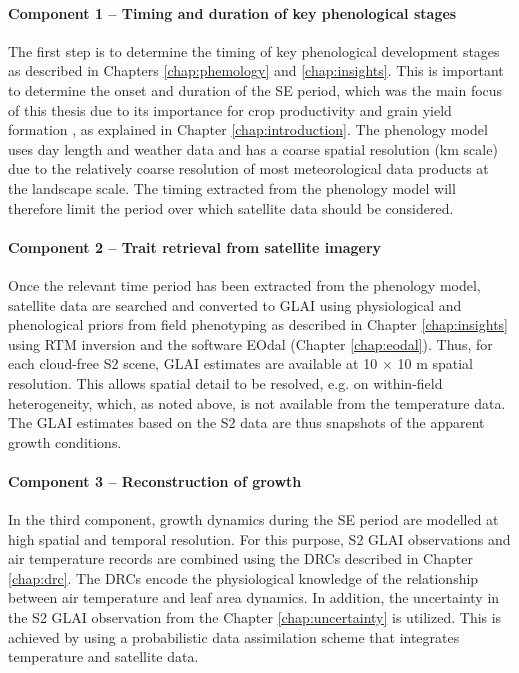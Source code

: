 \paragraph{Component 1 -- Timing and duration of key phenological stages}
The first step is to determine the timing of key phenological development stages as described in Chapters \ref{chap:phemology} and \ref{chap:insights}. This is important to determine the onset and duration of the \gls{SE} period, which was the main focus of this thesis due to its importance for crop productivity and grain yield formation \citep{gonzalez_grain_2003, fischer_wheat_2011}, as explained in Chapter \ref{chap:introduction}. The phenology model uses day length and weather data and has a coarse spatial resolution (km scale) due to the relatively coarse resolution of most meteorological data products at the landscape scale. The timing extracted from the phenology model will therefore limit the period over which satellite data should be considered.

\paragraph{Component 2 -- Trait retrieval from satellite imagery}
Once the relevant time period has been extracted from the phenology model, satellite data are searched and converted to \gls{GLAI} using physiological and phenological priors from field phenotyping as described in Chapter \ref{chap:insights} using RTM inversion and the software \gls{EOdal} (Chapter \ref{chap:eodal}). Thus, for each cloud-free \gls{S2} scene, \gls{GLAI} estimates are available at 10 $\times$ 10 m spatial resolution. This allows spatial detail to be resolved, e.g. on within-field heterogeneity, which, as noted above, is not available from the temperature data. The \gls{GLAI} estimates based on the \gls{S2} data are thus snapshots of the apparent growth conditions.

\paragraph{Component 3 -- Reconstruction of growth}
In the third component, growth dynamics during the \gls{SE} period are modelled at high spatial and temporal resolution. For this purpose, \gls{S2} \gls{GLAI} observations and air temperature records are combined using the \gls{DRC}s described in Chapter \ref{chap:drc}. The \gls{DRC}s encode the physiological knowledge of the relationship between air temperature and leaf area dynamics. In addition, the uncertainty in the \gls{S2} \gls{GLAI} observation from the Chapter \ref{chap:uncertainty} is utilized. This is achieved by using a probabilistic data assimilation scheme that integrates temperature and satellite data.

